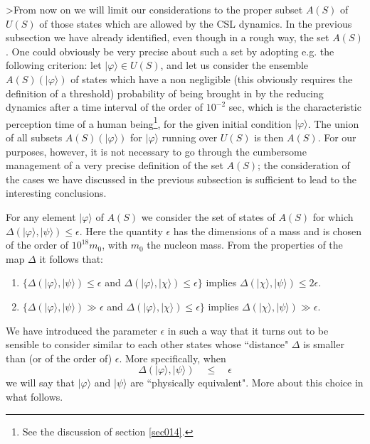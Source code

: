 \documentclass[10pt,a4paper]{article}
\begin{document}
>From now on we will limit our considerations to the proper subset
$A(S)$ of $U(S)$ of those states which are allowed by the CSL
dynamics. In the previous subsection we have already identified,
even though in a rough way, the set $A(S)$. One could obviously be
very precise about such a set by adopting e.g. the following
criterion: let $|\varphi\rangle \in U(S)$, and let us consider the
ensemble $A(S)(|\varphi\rangle)$ of states which have a non
negligible (this obviously requires the definition of a threshold)
probability of being brought in by the reducing dynamics after a
time interval of the order of $10^{-2}$ sec, which is the
characteristic perception time of a human being\footnote{See the
discussion of section \ref{sec014}.}, for the given initial
condition $|\varphi\rangle$. The union of all subsets
$A(S)(|\varphi\rangle)$ for $|\varphi\rangle$ running over $U(S)$
is then $A(S)$. For our purposes, however, it is not necessary to
go through the cumbersome management of a very precise definition
of the set $A(S)$; the consideration of the cases we have
discussed in the previous subsection is sufficient to lead to the
interesting conclusions.

For any element $|\varphi\rangle$ of $A(S)$ we consider the set of
states of $A(S)$ for which $\Delta (|\varphi\rangle, |\psi\rangle)
\leq \epsilon$. Here the quantity $\epsilon$ has the dimensions of
a mass and is chosen of the order of $10^{18} m_{0}$, with $m_{0}$
the nucleon mass. From the properties of the map $\Delta$ it
follows that:
\begin{enumerate}
\item $ \{ \Delta (|\varphi\rangle, |\psi\rangle) \leq \epsilon$
and $\Delta (|\varphi\rangle, |\chi\rangle) \leq \epsilon \}$
implies $\Delta (|\chi\rangle, |\psi\rangle) \leq 2\epsilon.$
\item $ \{ \Delta (|\varphi\rangle, |\psi\rangle) \gg \epsilon$
and $\Delta (|\varphi\rangle, |\chi\rangle) \leq \epsilon \}$
implies $\Delta (|\chi\rangle, |\psi\rangle) \gg \epsilon.$
\end{enumerate}

We have introduced the parameter $\epsilon$ in such a way that it
turns out to be sensible to consider similar to each other states
whose ``distance" $\Delta$ is smaller than (or of the order of)
$\epsilon$. More specifically, when
\begin{equation} \label{ctu}
\Delta (|\varphi\rangle, |\psi\rangle) \quad \leq \quad \epsilon
\end{equation}
we will say that $|\varphi\rangle$ and $|\psi\rangle$ are
``physically equivalent". More about this choice in what follows.
\end{document}
